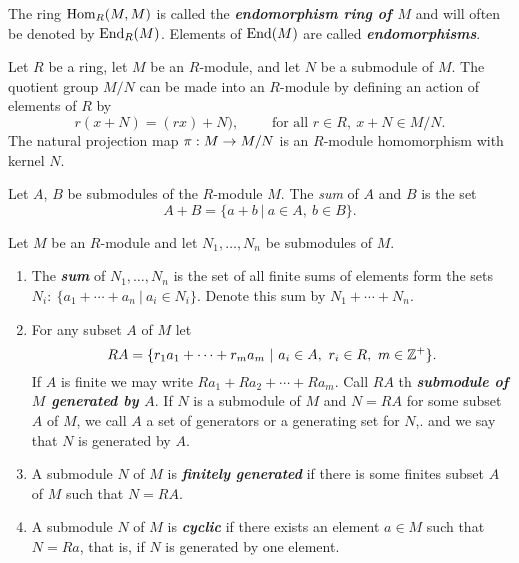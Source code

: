 \nl

\begin{defn}
The ring $\text{Hom}_R(M,M)$ is called the \textbf{\textit{endomorphism ring of $M$}} and will often be denoted by $\text{End}_R(M)$. Elements of $\text{End}(M)$ are called \textbf{\textit{endomorphisms}}.
\end{defn}

\nl

\begin{prop}
Let $R$ be a ring, let $M$ be an $R$-module, and let $N$ be a submodule of $M$. The quotient group $M/N$ can be made into an $R$-module by defining an action of elements of $R$ by
\[r(x + N) = (rx) + N),\qquad\text{ for all }r\in R,\ x + N \in M/N.\]
The natural projection map $\pi:M\rightarrow M/N$ is an $R$-module homomorphism with kernel $N$.
\end{prop}

\nl

\begin{defn}
Let $A$, $B$ be submodules of the $R$-module $M$. The \textit{sum} of $A$ and $B$ is the set 
\[A + B = \{a + b\ |\ a\in A,\ b\in B\}.\]
\end{defn}

\nl

\begin{defn}
Let $M$ be an $R$-module and let $N_1,\ldots,N_n$ be submodules of $M$.
\begin{enumerate}
\item The \textbf{\textit{sum}} of $N_1,\ldots,N_n$ is the set of all finite sums of elements form the sets $N_i:\ \{a_1+\cdots+a_n\ |\ a_i\in N_i\}$. Denote this sum by $N_1+\cdots +N_n$.
\item For any subset $A$ of $M$ let
\[RA = \{r_1a_1+\cdots+r_ma_m\ |\ a_i\in A,\ r_i \in R,\ m\in\mathbb{Z}^+\}.\]
If $A$ is finite we may write $Ra_1 + Ra_2+\cdots +Ra_m$. Call $RA$ th \textit{\textbf{submodule of $M$ generated by $A$}}. If $N$ is a submodule of $M$ and $N = RA$ for some subset $A$ of $M$, we call $A$ a set of generators or a generating set for $N$,. and we say that $N$ is generated by $A$.
\item A submodule $N$ of $M$ is \textbf{\textit{finitely generated}} if there is some finites subset $A$ of $M$ such that $N = RA$.
\item A submodule $N$ of $M$ is \textit{\textbf{cyclic}} if there exists an element $a\in M$ such that $N = Ra$, that is, if $N$ is generated by one element.
\end{enumerate}
\end{defn}

